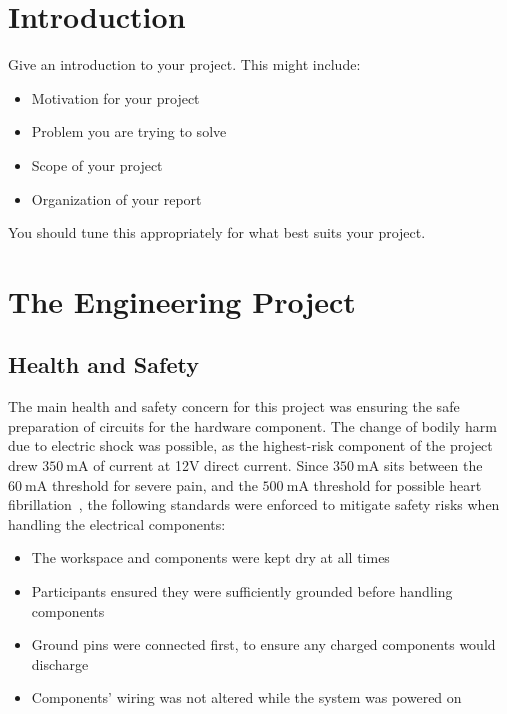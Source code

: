 \documentclass[12pt]{report}
\begin{document}

\endpreface
	

\chapter{Introduction}

Give an introduction to your project.  This might include:
\begin{itemize}
  \item Motivation for your project
  \item Problem you are trying to solve
  \item Scope of your project
  \item Organization of your report
\end{itemize}
You should tune this appropriately for what best suits your project.



\chapter{The Engineering Project}


\section{Health and Safety}

The main health and safety concern for this project was ensuring the safe preparation of circuits for the hardware 
component. The change of bodily harm due to electric shock was possible, as the highest-risk component of the project 
drew $\SI{350}{\milli\ampere}$ of current at 12V direct current. Since $\SI{350}{\milli\ampere}$ sits between the 
$\SI{60}{\milli\ampere}$ threshold for severe pain, and the $\SI{500}{\milli\ampere}$ threshold for possible heart
fibrillation~\autocite{CURRENTDANGER}, the following standards were enforced to mitigate safety risks when handling the 
electrical components:
\begin{itemize}
    \item The workspace and components were kept dry at all times
    \item Participants ensured they were sufficiently grounded before handling components
    \item Ground pins were connected first, to ensure any charged components would discharge
    \item Components' wiring was not altered while the system was powered on
\end{itemize}
\end{document}
